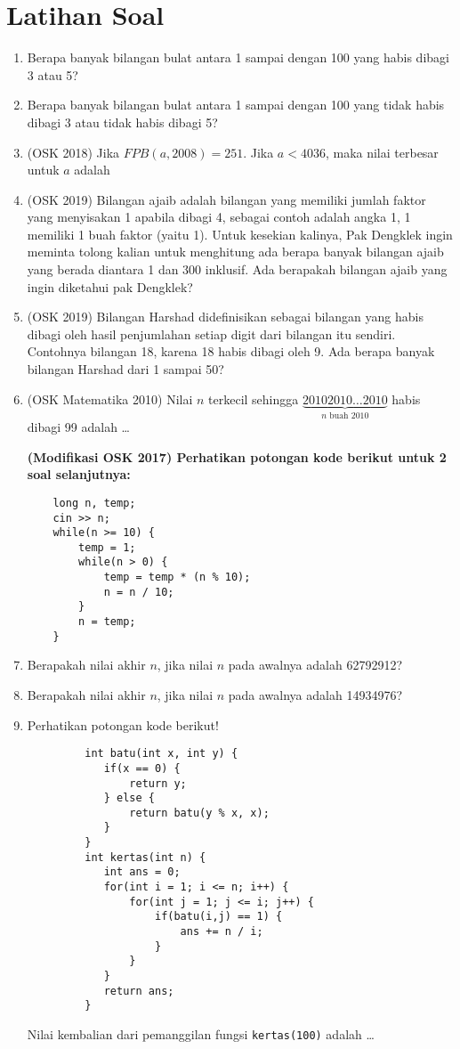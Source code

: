 \documentclass[11pt]{scrartcl}
\begin{document}
    \section{Latihan Soal}
	\begin{enumerate}	
	\item Berapa banyak bilangan bulat antara 1 sampai dengan 100 yang habis dibagi 3 atau 5?
	\item Berapa banyak bilangan bulat antara 1 sampai dengan 100 yang tidak habis dibagi 3 atau tidak 
	habis dibagi 5?
	\item (OSK 2018) Jika $FPB(a,2008)=251$. Jika $a < 4036$, maka nilai terbesar untuk $a$ adalah
	\item (OSK 2019)  Bilangan ajaib adalah bilangan yang memiliki jumlah faktor yang menyisakan 1 apabila dibagi 4, sebagai 
	contoh adalah angka 1, 1 memiliki 1 buah faktor (yaitu 1). Untuk kesekian kalinya, Pak Dengklek ingin 
	meminta tolong kalian untuk menghitung ada berapa banyak bilangan ajaib yang berada diantara 1 dan 
	300 inklusif. Ada berapakah bilangan ajaib yang ingin diketahui pak Dengklek? 
	\item (OSK 2019) Bilangan Harshad didefinisikan sebagai bilangan yang habis dibagi oleh hasil penjumlahan setiap digit 
	dari bilangan itu sendiri. Contohnya bilangan 18, karena 18 habis dibagi oleh 9. Ada berapa banyak 
	bilangan Harshad dari 1 sampai 50? 
	\item (OSK Matematika 2010) Nilai $n$ terkecil sehingga $\underbrace{20102010\dots2010}_\text{$n$ buah 2010}$ habis dibagi 99 adalah \dots
	
	\textbf{(Modifikasi OSK 2017) Perhatikan potongan kode berikut untuk 2 soal selanjutnya:}
	\begin{lstlisting}
	long n, temp;
	cin >> n;
	while(n >= 10) {
		temp = 1;
		while(n > 0) {
			temp = temp * (n % 10);
			n = n / 10;
		}
		n = temp;
	}
	\end{lstlisting}
	\item Berapakah nilai akhir $n$, jika nilai $n$ pada awalnya adalah 62792912?
	\item Berapakah nilai akhir $n$, jika nilai $n$ pada awalnya adalah 14934976?
	
	\item Perhatikan potongan kode berikut!
		 \begin{lstlisting}
		 int batu(int x, int y) {
		 	if(x == 0) {
		 		return y;
		 	} else {
		 		return batu(y % x, x);
		 	}
		 }
		 int kertas(int n) {
		 	int ans = 0;
		 	for(int i = 1; i <= n; i++) {
		 		for(int j = 1; j <= i; j++) {
		 			if(batu(i,j) == 1) {
		 				ans += n / i;
		 			}
		 		}
		 	}
		 	return ans;
		 }
		 \end{lstlisting}
		 Nilai  kembalian dari pemanggilan fungsi \verb*|kertas(100)| adalah \dots
		 

\end{enumerate}
\end{document}
